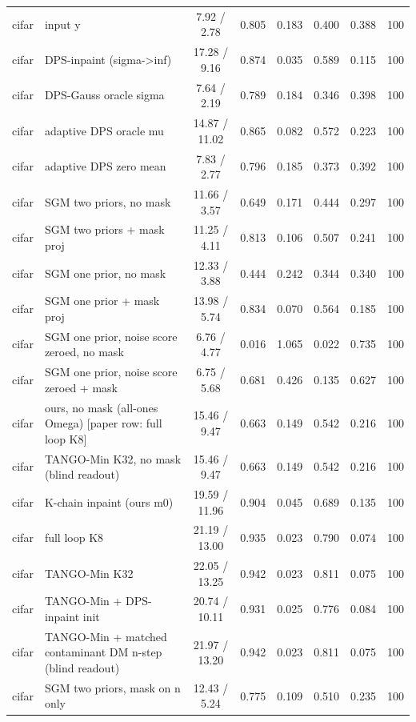 \begin{tabular}{llcccccc}
\midrule
cifar & input y & 7.92 / 2.78 & 0.805 & 0.183 & 0.400 & 0.388 & 100\\
cifar & DPS-inpaint (sigma->inf) & 17.28 / 9.16 & 0.874 & 0.035 & 0.589 & 0.115 & 100\\
cifar & DPS-Gauss oracle sigma & 7.64 / 2.19 & 0.789 & 0.184 & 0.346 & 0.398 & 100\\
cifar & adaptive DPS oracle mu & 14.87 / 11.02 & 0.865 & 0.082 & 0.572 & 0.223 & 100\\
cifar & adaptive DPS zero mean & 7.83 / 2.77 & 0.796 & 0.185 & 0.373 & 0.392 & 100\\
cifar & SGM two priors, no mask & 11.66 / 3.57 & 0.649 & 0.171 & 0.444 & 0.297 & 100\\
cifar & SGM two priors + mask proj & 11.25 / 4.11 & 0.813 & 0.106 & 0.507 & 0.241 & 100\\
cifar & SGM one prior, no mask & 12.33 / 3.88 & 0.444 & 0.242 & 0.344 & 0.340 & 100\\
cifar & SGM one prior + mask proj & 13.98 / 5.74 & 0.834 & 0.070 & 0.564 & 0.185 & 100\\
cifar & SGM one prior, noise score zeroed, no mask & 6.76 / 4.77 & 0.016 & 1.065 & 0.022 & 0.735 & 100\\
cifar & SGM one prior, noise score zeroed + mask & 6.75 / 5.68 & 0.681 & 0.426 & 0.135 & 0.627 & 100\\
cifar & ours, no mask (all-ones Omega) [paper row: full loop K8] & 15.46 / 9.47 & 0.663 & 0.149 & 0.542 & 0.216 & 100\\
cifar & TANGO-Min K32, no mask (blind readout) & 15.46 / 9.47 & 0.663 & 0.149 & 0.542 & 0.216 & 100\\
cifar & K-chain inpaint (ours m0) & 19.59 / 11.96 & 0.904 & 0.045 & 0.689 & 0.135 & 100\\
cifar & full loop K8 & 21.19 / 13.00 & 0.935 & 0.023 & 0.790 & 0.074 & 100\\
cifar & TANGO-Min K32 & 22.05 / 13.25 & 0.942 & 0.023 & 0.811 & 0.075 & 100\\
cifar & TANGO-Min + DPS-inpaint init & 20.74 / 10.11 & 0.931 & 0.025 & 0.776 & 0.084 & 100\\
cifar & TANGO-Min + matched contaminant DM n-step (blind readout) & 21.97 / 13.20 & 0.942 & 0.023 & 0.811 & 0.075 & 100\\
cifar & SGM two priors, mask on n only & 12.43 / 5.24 & 0.775 & 0.109 & 0.510 & 0.235 & 100\\
\bottomrule
\end{tabular}
